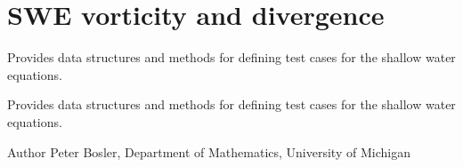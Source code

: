 \hypertarget{group__SWEVorticityAndDivergence}{\section{S\+W\+E vorticity and divergence}
\label{group__SWEVorticityAndDivergence}
}


Provides data structures and methods for defining test cases for the shallow water equations.  


Provides data structures and methods for defining test cases for the shallow water equations. 

\begin{DoxyAuthor}{Author}
Peter Bosler, Department of Mathematics, University of Michigan 
\end{DoxyAuthor}
